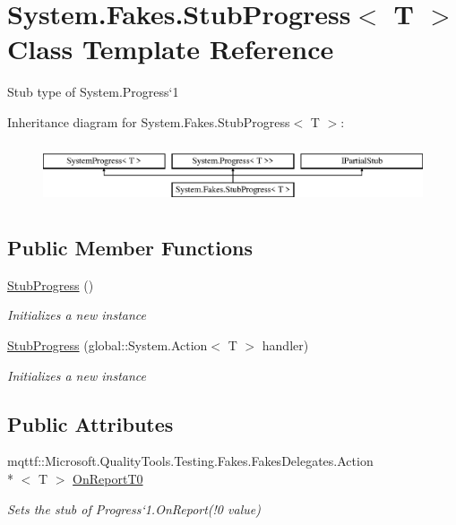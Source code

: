 \hypertarget{class_system_1_1_fakes_1_1_stub_progress_3_01_t_01_4}{\section{System.\-Fakes.\-Stub\-Progress$<$ T $>$ Class Template Reference}
\label{class_system_1_1_fakes_1_1_stub_progress_3_01_t_01_4}
}


Stub type of System.\-Progress`1 


Inheritance diagram for System.\-Fakes.\-Stub\-Progress$<$ T $>$\-:\begin{figure}[H]
\begin{center}
\leavevmode
\includegraphics[height=1.786284cm]{class_system_1_1_fakes_1_1_stub_progress_3_01_t_01_4}
\end{center}
\end{figure}
\subsection*{Public Member Functions}
\begin{DoxyCompactItemize}
\item 
\hyperlink{class_system_1_1_fakes_1_1_stub_progress_3_01_t_01_4_a1eeea2cdd28d02b50d5802efd4fc4836}{Stub\-Progress} ()
\begin{DoxyCompactList}\small\item\em Initializes a new instance\end{DoxyCompactList}\item 
\hyperlink{class_system_1_1_fakes_1_1_stub_progress_3_01_t_01_4_aaebbc0d840f774a6a6d96f0f03591559}{Stub\-Progress} (global\-::\-System.\-Action$<$ T $>$ handler)
\begin{DoxyCompactList}\small\item\em Initializes a new instance\end{DoxyCompactList}\end{DoxyCompactItemize}
\subsection*{Public Attributes}
\begin{DoxyCompactItemize}
\item 
mqttf\-::\-Microsoft.\-Quality\-Tools.\-Testing.\-Fakes.\-Fakes\-Delegates.\-Action\\*
$<$ T $>$ \hyperlink{class_system_1_1_fakes_1_1_stub_progress_3_01_t_01_4_a27d23fa4965c308068c8d2032da7545b}{On\-Report\-T0}
\begin{DoxyCompactList}\small\item\em Sets the stub of Progress`1.On\-Report(!0 value)\end{DoxyCompactList}\end{DoxyCompactItemize}
